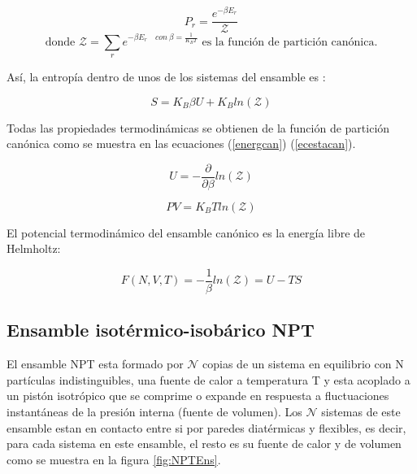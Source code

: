 \begin{equation} \label{probcan}
    P_r = \frac{e^{-\beta E_r}}{\mathcal{Z}}
\end{equation}
\begin{equation*} \label{funcpartcan}
    \text{donde }\mathcal{Z} = \sum_r e^{-\beta E_r \quad con\ \beta=\frac{1}{K_{B}T}} \text{ es la función de partición canónica.}
\end{equation*}


Así, la entropía dentro de unos de los sistemas del ensamble es \cite{mandl1988statistical}:

\begin{equation} \label{entrnvt}
    S = K_{B}\beta U + K_{B}ln(\mathcal{Z})
\end{equation}

Todas las propiedades termodinámicas se obtienen de la función de partición canónica como se muestra en las ecuaciones (\ref{energcan}) (\ref{ecestacan}).

\begin{equation} \label{energcan}
    U=-\frac{\partial}{\partial \beta}ln(\mathcal{Z})
\end{equation}

\begin{equation} \label{ecestacan}
    PV=K_{B}Tln(\mathcal{Z})
\end{equation}

El potencial termodinámico del ensamble canónico es la energía libre de Helmholtz:

\begin{equation} \label{potHelm}
    F(N,V,T)=-\frac{1}{\beta}ln(\mathcal{Z})=U-TS
\end{equation}

\subsection{Ensamble isotérmico-isobárico NPT}

El ensamble NPT esta formado por $\mathcal{N}$ copias de un sistema en equilibrio con N partículas indistinguibles, una fuente de calor a temperatura T y esta acoplado a un pistón isotrópico que se comprime o expande en respuesta a fluctuaciones instantáneas de la presión interna (fuente de volumen). Los $\mathcal{N}$ sistemas de este ensamble estan en contacto entre si por paredes diatérmicas y flexibles, es decir, para cada sistema en este ensamble, el resto es su fuente de calor y de volumen como se muestra en la figura \ref{fig:NPTEns}.\\

